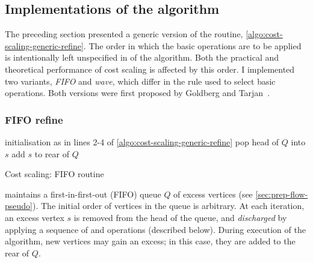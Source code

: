 \subsection{Implementations of the algorithm} \label{sec:impl-cost-scaling-implementations}

The preceding section presented a generic version of the  routine, \cref{algo:cost-scaling-generic-refine}. The order in which the basic operations are to be applied is intentionally left unspecified in  of the algorithm. Both the practical and theoretical performance of cost scaling is affected by this order. I implemented two variants, \textit{FIFO} and \textit{wave}, which differ in the rule used to select basic operations. Both versions were first proposed by Goldberg and Tarjan~\cite{Goldberg:1990}.

\subsubsection{FIFO refine}

\begin{algorithm}
\begin{algorithmic}[1]
        \State initialisation as in lines 2-4 of \cref{algo:cost-scaling-generic-refine}
         
            \State pop head of $Q$ into $s$
            \State {} 
                \State add $s$ to rear of $Q$
                \Break
            \EndIf
        \EndWhile
    \EndFunction
\end{algorithmic}
\caption{Cost scaling: FIFO  routine}
\label{algo:cost-scaling-first-active-refine}
\end{algorithm}

 maintains a first-in-first-out (FIFO) queue $Q$ of excess vertices (see \cref{sec:prep-flow-pseudo}). The initial order of vertices in the queue is arbitrary. At each iteration, an excess vertex $s$ is removed from the head of the queue, and \emph{discharged} by applying a sequence of  and  operations (described below). During execution of the algorithm, new vertices may gain an excess; in this case, they are added to the rear of $Q$.

